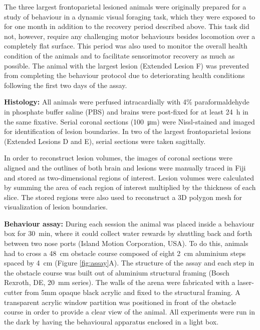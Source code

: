 The three largest frontoparietal lesioned animals were originally prepared for a study of behaviour in a dynamic visual foraging task, which they were exposed to for one month in addition to the recovery period described above. This task did not, however, require any challenging motor behaviours besides locomotion over a completely flat surface. This period was also used to monitor the overall health condition of the animals and to facilitate sensorimotor recovery as much as possible. The animal with the largest lesion (Extended Lesion F) was prevented from completing the behaviour protocol due to deteriorating health conditions following the first two days of the assay.

\textbf{Histology:} All animals were perfused intracardially with 4\% paraformaldehyde in phosphate buffer saline (PBS) and brains were post-fixed for at least \SI{24}{\hour} in the same fixative. Serial coronal sections (\SI{100}{\micro\meter}) were Nissl-stained and imaged for identification of lesion boundaries. In two of the largest frontoparietal lesions (Extended Lesions D and E), serial sections were taken sagittally.

In order to reconstruct lesion volumes, the images of coronal sections were aligned and the outlines of both brain and lesions were manually traced in Fiji \cite{Schindelin2012} and stored as two-dimensional regions of interest. Lesion volumes were calculated by summing the area of each region of interest multiplied by the thickness of each slice. The stored regions were also used to reconstruct a 3D polygon mesh for visualization of lesion boundaries.

\textbf{Behaviour assay:} During each session the animal was placed inside a behaviour box for \SI{30}{\minute}, where it could collect water rewards by shuttling back and forth between two nose ports (Island Motion Corporation, USA). To do this, animals had to cross a \SI{48}{\centi\meter} obstacle course composed of eight \SI{2}{\centi\meter} aluminium steps spaced by \SI{4}{\centi\meter} (Figure \ref{fig:assay}A). The structure of the assay and each step in the obstacle course was built out of aluminium structural framing (Bosch Rexroth, DE, \SI{20}{\milli\meter} series). The walls of the arena were fabricated with a laser-cutter from 5mm opaque black acrylic and fixed to the structural framing. A transparent acrylic window partition was positioned in front of the obstacle course in order to provide a clear view of the animal. All experiments were run in the dark by having the behavioural apparatus enclosed in a light box.

